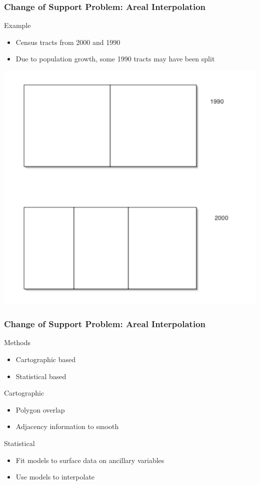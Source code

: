 \documentclass[nototal,handout]{beamer}
\begin{document}
 \begin{frame}[<+->]
  \frametitle{Change of Support Problem: Areal Interpolation}

\begin{block}{Example}
     \begin{itemize}
       \item Census tracts from 2000 and 1990
       \item Due to population growth, some 1990 tracts may have been split
     \end{itemize}
    \end{block}
\begin{block}{}
    \begin{center}
      \includegraphics[width=.45\linewidth]{arealinterpolation}
    \end{center}
\end{block}
  \end{frame}

 \begin{frame}[<+->]
 \frametitle{Change of Support Problem: Areal Interpolation}
\begin{block}{Methods}
     \begin{itemize}
       \item Cartographic based
       \item Statistical based
     \end{itemize}
    \end{block}
\begin{block}{Cartographic}
  \begin{itemize}
    \item Polygon overlap
    \item Adjacency information to smooth
  \end{itemize}
\end{block}
\begin{block}{Statistical}
  \begin{itemize}
    \item Fit models to surface data on ancillary variables
    \item Use models to interpolate
  \end{itemize}
\end{block}

  \end{frame}
 
\end{document}
